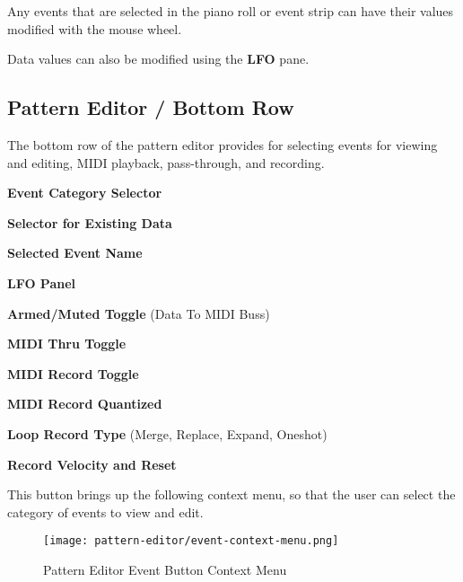    
   Any events that are selected in the piano roll or event strip can have
   their values modified with the mouse wheel.

   Data values can also be modified using the \textbf{LFO} pane.

\subsection{Pattern Editor / Bottom Row}
\label{subsec:pattern_editor_bottom}

   The bottom row of the pattern editor provides for
   selecting events for viewing and editing, MIDI playback,
   pass-through, and recording.

   \begin{enumber}
      \item \textbf{Event Category Selector}
      \item \textbf{Selector for Existing Data}
      \item \textbf{Selected Event Name}
      \item \textbf{LFO Panel}
      \item \textbf{Armed/Muted Toggle} (Data To MIDI Buss)
      \item \textbf{MIDI Thru Toggle}
      \item \textbf{MIDI Record Toggle}
      \item \textbf{MIDI Record Quantized}
      \item \textbf{Loop Record Type} (Merge, Replace, Expand, Oneshot)
      \item \textbf{Record Velocity and Reset}
   \end{enumber}

   \setcounter{ItemCounter}{0}      %

   This button brings up the following context menu, so that the user can
   select the category of events to view and edit.

\begin{figure}[H]
   \centering 
   \texttt{[image: pattern-editor/event-context-menu.png]}
   \caption{Pattern Editor Event Button Context Menu}
   \label{fig:pattern_editor_bottom_event_context_menu}
\end{figure}

